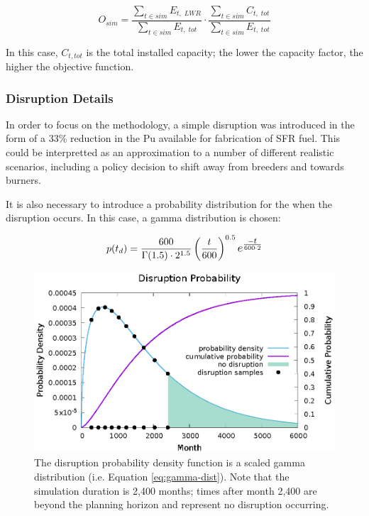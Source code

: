 \begin{equation}
    O_{sim} = \frac{\sum\limits_{t \in sim} E_{t,\;LWR}}{\sum\limits_{t \in sim} E_{t,\;tot}}
              \cdot
              \frac{\sum\limits_{t \in sim} C_{t,\;tot}}{\sum\limits_{t \in sim} E_{t,\;tot}}
    \label{eq:exp3-obj}
\end{equation}

In this case, $C_{t,tot}$ is the total installed capacity; the lower the capacity factor, the higher the objective function.

\subsubsection{Disruption Details}

In order to focus on the methodology, a simple disruption was introduced in
the form of a 33\% reduction in the Pu available for fabrication of \gls{SFR}
fuel.  This could be interpretted as an approximation to a number of different
realistic scenarios, including a policy decision to shift away from breeders
and towards burners.

It is also necessary to introduce a probability distribution for the when the
disruption occurs.  In this case, a gamma distribution is chosen:

\begin{equation}
    p(t_d) = \frac{600}{\Gamma(1.5)\cdot 2^{1.5}} \left(\frac{t}{600}\right)^{0.5} \mathlarger{e^{\frac{\mathlarger{\mathsmaller{-}t}}{600 \cdot 2}}}
    \label{eq:gamma-dist}
\end{equation}

\begin{figure}[!htb]
    \centering
    \includegraphics[width=1.0\columnwidth]{gamma-dist.eps}
    \caption[Disruption Probability Distribution]{
        The disruption probability density function is a scaled gamma
        distribution (i.e. Equation \ref{eq:gamma-dist}).  Note that the
        simulation duration is 2,400 months; times after month 2,400 are
        beyond the planning horizon and represent no disruption occurring.
    }
    \label{fig:exp3-gamma-dist}
\end{figure}


